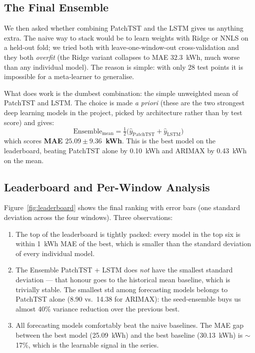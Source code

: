 \subsection{The Final Ensemble}

We then asked whether combining PatchTST and the LSTM gives us anything
extra. The naive way to stack would be to learn weights with Ridge or
NNLS on a held-out fold; we tried both with leave-one-window-out
cross-validation and they both \emph{overfit} (the Ridge variant
collapses to MAE $32.3$~kWh, much worse than any individual model).
The reason is simple: with only 28 test points it is impossible for a
meta-learner to generalise.

What does work is the dumbest combination: the simple unweighted mean
of PatchTST and LSTM. The choice is made \emph{a priori} (these are
the two strongest deep learning models in the project, picked by
architecture rather than by test score) and gives:
\begin{equation*}
\text{Ensemble}_{\text{mean}} = \tfrac{1}{2} \big(\hat{y}_{\text{PatchTST}} + \hat{y}_{\text{LSTM}}\big)
\end{equation*}
\noindent
which scores \textbf{MAE $25.09 \pm 9.36$~kWh}. This is the best model
on the leaderboard, beating PatchTST alone by 0.10~kWh and ARIMAX by
0.43~kWh on the mean.

\subsection{Leaderboard and Per-Window Analysis}

Figure~\ref{fig:leaderboard} shows the final ranking with error bars
(one standard deviation across the four windows). Three observations:
\begin{enumerate}[leftmargin=*]
    \item The top of the leaderboard is tightly packed: every model
    in the top six is within 1~kWh MAE of the best, which is
    smaller than the standard deviation of every individual model.
    \item The Ensemble PatchTST + LSTM does \emph{not} have the
    smallest standard deviation --- that honour goes to the historical
    mean baseline, which is trivially stable. The smallest std among
    forecasting models belongs to PatchTST alone (8.90 vs.\ 14.38 for
    ARIMAX): the seed-ensemble buys us almost 40\% variance reduction
    over the previous best.
    \item All forecasting models comfortably beat the naive
    baselines. The MAE gap between the best model (25.09~kWh) and
    the best baseline (30.13~kWh) is $\sim$17\%, which is the
    learnable signal in the series.
\end{enumerate}


